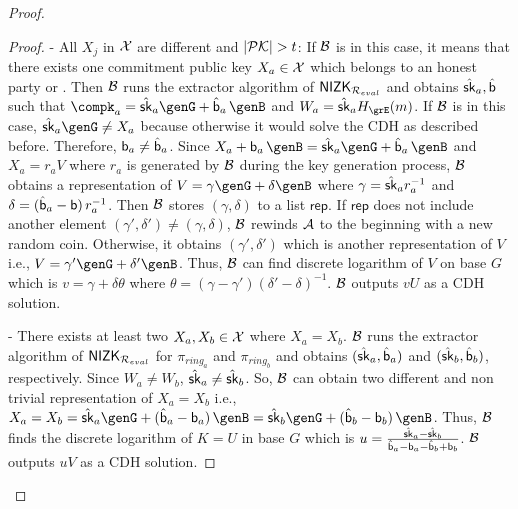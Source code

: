 \begin{proof}
\begin{proof}
			- All $ X_j $ in $ {\mathcal{X}} $ are different and $ |{\mathcal{PK}}| > t $: If $ \mathcal{B} $ is in this case, it means that there exists one commitment public key $ X_a \in {\ensuremath{\mathcal{X}}} $ which belongs to an honest party or . Then $ \mathcal{B} $ runs the extractor algorithm of $ {\mathsf{NIZK}}_{\mathcal{R}_{eval}} $ and obtains $ \hat{\mathsf{sk}}_a, \hat{\mathsf{b}} $ such that $ \compk_a = \hat{\sk}_a\genG + \hat{\openpk}_a \,\genB $ and $ W_a = \hat{\sk}_a \hashG(m) $.  If $ \mathcal{B} $ is in this case, $ \hat{\sk}_a\genG\neq X_a $ because otherwise it would solve the CDH as described before. Therefore, $ \mathsf{b}_a \neq \hat{\mathsf{b}}_a $. Since $ X_a + \openpk_a \, \genB = \hat{\sk}_a\genG + \hat{\openpk}_a \,\genB  $ and $ X_a = r_aV $ where $ r_a $ is generated by $ \mathcal{B} $ during the key generation process, $ \mathcal{B} $ obtains a representation of $ V = \gamma \genG + \delta \genB $ where $ \gamma = \hat{\mathsf{sk}}_ar^{-1}_a  $ and $ \delta = (\hat{\mathsf{b}}_a -\mathsf{b})\,r_a^{-1} $. Then $ \mathcal{B} $ stores $ (\gamma, \delta) $ to a list $ \mathsf{rep} $. If $ \mathsf{rep} $ does not include another element $ (\gamma', \delta')  \neq (\gamma, \delta) $, $ \mathcal{B} $ rewinds $ \mathcal{A} $ to the beginning with a new random coin.  Otherwise, it obtains $ (\gamma', \delta') $ which is another representation of $ V $ i.e., $ V = \gamma' \genG + \delta' \genB $. Thus, $ \mathcal{B} $ can find discrete logarithm of $ V $ on base $ G $ which is $ v = \gamma + \delta \theta $ where $ \theta = (\gamma - \gamma')(\delta' - \delta)^{-1} $. $ \mathcal{B} $ outputs $ vU $ as a CDH solution.
				
				
			- There exists at least two $ X_a,X_b \in {\ensuremath{\mathcal{X}}} $ where $ X_a = X_b $. $ \mathcal{B} $ runs the extractor algorithm of $ {\mathsf{NIZK}}_{\mathcal{R}_{eval}} $ for $ \pi_{ring_a} $ and $ \pi_{ring_b}  $ and obtains $(\hat{\mathsf{sk}}_a,\hat{\mathsf{b}}_a )$ and $(\hat{\mathsf{sk}}_b,\hat{\mathsf{b}}_b )$, respectively. Since $ W_a \neq W_b $, $ \hat{\mathsf{sk}}_a \neq \hat{\mathsf{sk}}_b $.  So, $ \mathcal{B} $ can obtain  two different and non trivial representation of $ X_a = X_b $ i.e., $ X_a = X_b = \hat{\sk}_a\genG + (\hat{\openpk}_a - \openpk_a) \, \genB = \hat{\sk}_b\genG + (\hat{\openpk}_b - \openpk_b) \, \genB  $. Thus, $ \mathcal{B} $ finds the discrete logarithm of $ K = U $ in base $ G $ which is $ u = \frac{\hat{\mathsf{sk}}_a - \hat{\mathsf{sk}}_b}{\hat{\mathsf{b}}_a -\mathsf{b}_a -\hat{\mathsf{b}}_b + \mathsf{b}_b} $. $ \mathcal{B} $ outputs $ uV $ as a CDH solution.


\end{proof}
\end{proof}
